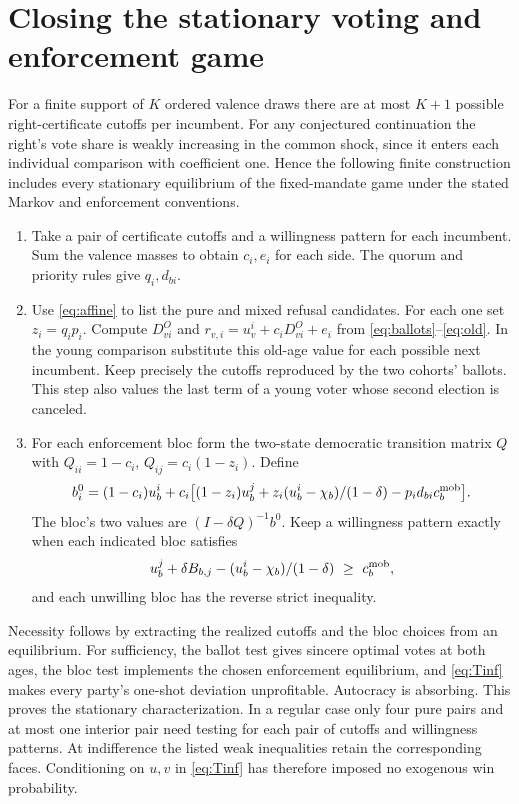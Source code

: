 \documentclass[11pt,letterpaper]{article}
\begin{document}
\newpage
\section{Closing the stationary voting and enforcement game}\label{sec:closing}
For a finite support of \(K\) ordered valence draws there are at most \(K+1\) possible right-certificate cutoffs per incumbent. For any conjectured continuation the right's vote share is weakly increasing in the common shock, since it enters each individual comparison with coefficient one. Hence the following finite construction includes every stationary equilibrium of the fixed-mandate game under the stated Markov and enforcement conventions.

\begin{enumerate}\setlength{\itemsep}{4pt}
\item Take a pair of certificate cutoffs and a willingness pattern for each incumbent. Sum the valence masses to obtain \(c_i,e_i\) for each side. The quorum and priority rules give \(q_i,d_{bi}\).
\item Use \eqref{eq:affine} to list the pure and mixed refusal candidates. For each one set \(z_i=q_ip_i\). Compute \(D^O_{vi}\) and \(r_{v,i}=u_v^i+c_iD^O_{vi}+e_i\) from \eqref{eq:ballots}--\eqref{eq:old}. In the young comparison substitute this old-age value for each possible next incumbent. Keep precisely the cutoffs reproduced by the two cohorts' ballots. This step also values the last term of a young voter whose second election is canceled.
\item For each enforcement bloc form the two-state democratic transition matrix \(Q\) with \(Q_{ii}=1-c_i\), \(Q_{ij}=c_i(1-z_i)\). Define
\[
 b_i^0=(1-c_i)u_b^i+c_i\big[(1-z_i)u_b^j+
          z_i(u_b^i-\chi_b)/(1-\delta)-p_i d_{bi}c_b^{\rm mob}\big].
\]
The bloc's two values are \((I-\delta Q)^{-1}b^0\). Keep a willingness pattern exactly when each indicated bloc satisfies
\[
 u_b^j+\delta B_{b,j}-(u_b^i-\chi_b)/(1-\delta)\ \ge\ c_b^{\rm mob},
\]
and each unwilling bloc has the reverse strict inequality.
\end{enumerate}
Necessity follows by extracting the realized cutoffs and the bloc choices from an equilibrium. For sufficiency, the ballot test gives sincere optimal votes at both ages, the bloc test implements the chosen enforcement equilibrium, and \eqref{eq:Tinf} makes every party's one-shot deviation unprofitable. Autocracy is absorbing. This proves the stationary characterization. In a regular case only four pure pairs and at most one interior pair need testing for each pair of cutoffs and willingness patterns. At indifference the listed weak inequalities retain the corresponding faces. Conditioning on \(u,v\) in \eqref{eq:Tinf} has therefore imposed no exogenous win probability.
\end{document}
